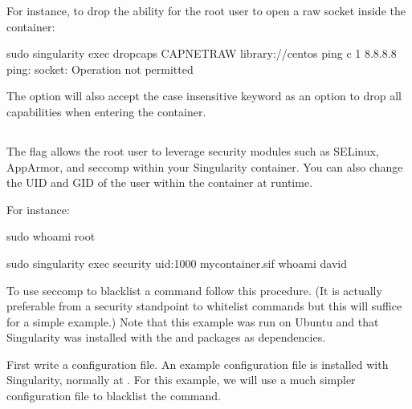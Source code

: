 \documentclass[letterpaper,10pt,english]{sphinxmanual}
\begin{document}
For instance, to drop the ability for the root user to open a raw socket inside
the container:

%
\begin{sphinxVerbatim}[commandchars=\\\{\}]
\PYGZdl{} sudo singularity exec \PYGZhy{}\PYGZhy{}drop\PYGZhy{}caps CAP\PYGZus{}NET\PYGZus{}RAW library://centos ping \PYGZhy{}c 1 8.8.8.8
ping: socket: Operation not permitted
\end{sphinxVerbatim}

The  option will also accept the case insensitive keyword 
as an option to drop all capabilities when entering the container.


\subsection{}
\label{\detokenize{security_options:security}}
The  flag allows the root user to leverage security modules such
as SELinux, AppArmor, and seccomp within your Singularity container. You can
also change the UID and GID of the user within the container at runtime.

For instance:

%
\begin{sphinxVerbatim}[commandchars=\\\{\}]
\PYGZdl{} sudo whoami
root

\PYGZdl{} sudo singularity exec \PYGZhy{}\PYGZhy{}security uid:1000 my\PYGZus{}container.sif whoami
david
\end{sphinxVerbatim}

To use seccomp to blacklist a command follow this procedure. (It is actually
preferable from a security standpoint to whitelist commands but this will
suffice for a simple example.)  Note that this example was run on Ubuntu and
that Singularity was installed with the  and 
packages as dependencies.

First write a configuration file.  An example configuration file is installed
with Singularity, normally at .
For this example, we will use a much simpler configuration file to blacklist the
 command.
\end{document}
